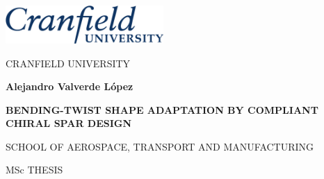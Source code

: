 



\thispagestyle{empty}

\vspace{-20mm}

\Large \begin{center}


\begin{flushright}
    \includegraphics[width=6.0cm]{figures/logos_Cranfield/Cranfield_logo_blue}
\end{flushright}

\vspace{10mm}

CRANFIELD UNIVERSITY

\vspace{30mm}

\LARGE \textbf{Alejandro Valverde L\'opez}

\vspace{25mm}

\textbf{BENDING-TWIST SHAPE ADAPTATION BY COMPLIANT CHIRAL SPAR DESIGN}

\vspace{35mm}

\Large SCHOOL OF AEROSPACE, TRANSPORT AND MANUFACTURING

\vspace{10mm}

MSc THESIS

\end{center} \normalsize

\pagebreak


\ClearDoublePageOrNot{\controlClearPage} %

